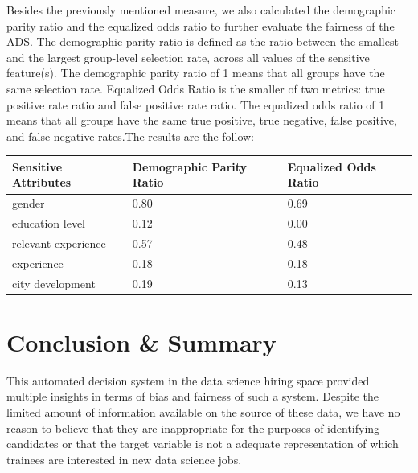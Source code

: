 Besides the previously mentioned measure, we also calculated the demographic parity ratio and the equalized odds ratio to further evaluate the fairness of the ADS. The demographic parity ratio is defined as the ratio between the smallest and the largest group-level selection rate, across all values of the sensitive feature(s). The demographic parity ratio of 1 means that all groups have the same selection rate. Equalized Odds Ratio is the smaller of two metrics: true positive rate ratio and false positive rate ratio. The equalized odds ratio of 1 means that all groups have the same true positive, true negative, false positive, and false negative rates.The results are the follow:
\begin{table}[h]
\centering
\begin{tabular}{ |p{4cm}||p{3cm}||p{3cm}|}
 \hline
Sensitive Attributes 		& Demographic Parity Ratio & Equalized Odds Ratio\\
 \hline

gender 	& 0.80 & 0.69 \\

education level 	& 0.12 & 0.00\\

relevant experience 	& 0.57 & 0.48\\

experience & 0.18 & 0.18\\

city development		 & 0.19 & 0.13\\

 \hline
\end{tabular}
\end{table}

\pagebreak

\section{Conclusion \& Summary}

This automated decision system in the data science hiring space provided multiple insights in terms of bias and fairness of such a system.  Despite the limited amount of information available on the source of these data, we have no reason to believe that they are inappropriate for the purposes of identifying candidates or that the target variable is not a adequate representation of which trainees are interested in new data science jobs.  

